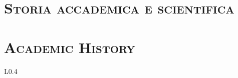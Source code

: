 \documentclass[a4paper,11pt]{article}
\begin{document}
\maketitle
\justifying

 {
  \section*{\scshape{Storia accademica e scientifica}}
} {
  \section*{\scshape{Academic History}}
}

\begin{wrapfigure}{L}{0.4\textwidth}
\end{wrapfigure}

\noindent


\newpage
\end{document}
